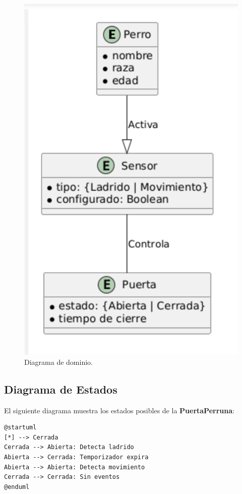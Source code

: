 \begin{figure}[!h]
\centering
\includegraphics[scale=0.5]{Pictures/dominio.png}
\caption{Diagrama de dominio.}
\label{fig:diag-dom}
\end{figure}

\subsection{Diagrama de Estados}
El siguiente diagrama muestra los estados posibles de la \textbf{PuertaPerruna}:

\begin{tcolorbox}[colback=gray!5!white,colframe=orange!60!gray,title=Diagrama de Estados en PlantUML]
\begin{verbatim}
@startuml
[*] --> Cerrada
Cerrada --> Abierta: Detecta ladrido
Abierta --> Cerrada: Temporizador expira
Abierta --> Abierta: Detecta movimiento
Cerrada --> Cerrada: Sin eventos
@enduml
\end{verbatim}
\end{tcolorbox}

